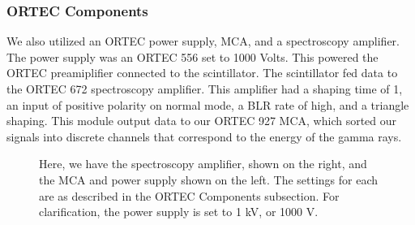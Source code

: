 \documentclass[10pt,letterpaper,onecolumn]{article}
\begin{document}
\subsubsection*{ORTEC Components}
We also utilized an ORTEC power supply, MCA, and a spectroscopy amplifier. The power supply was an ORTEC 556 set to 1000 Volts. This powered the ORTEC preamiplifier connected to the scintillator. The scintillator fed data to the ORTEC 672 spectroscopy amplifier. This amplifier had a shaping time of 1, an input of positive polarity on normal mode, a BLR rate of high, and a triangle shaping. This module output data to our ORTEC 927 MCA, which sorted our signals into discrete channels that correspond to the energy of the gamma rays.
\begin{figure}
    \begin{center}
        \qquad
        \caption{Here, we have the spectroscopy amplifier, shown on the right, and the MCA and power supply shown on the left. The settings for each are as described in the ORTEC Components subsection. For clarification, the power supply is set to 1 kV, or 1000 V.}%
        \label{fig:apparatus}%
    \end{center}
\end{figure}
\end{document}
